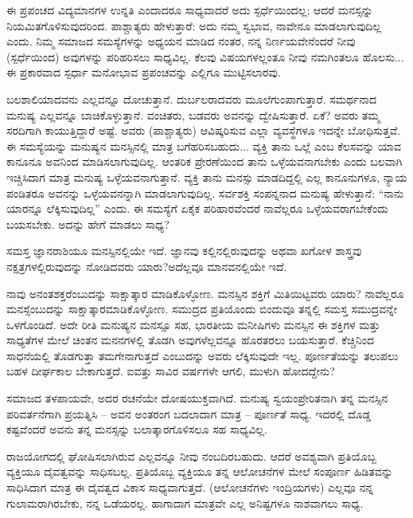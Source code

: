 \newpage

ಈ ಪ್ರಪಂಚದ ವಿದ್ಯಮಾನಗಳ ಉನ್ನತಿ ಎಂದಾದರೂ ಸಾಧ್ಯವಾದರೆ ಅದು ಸ್ಪರ್ಧೆಯಿಂದಲ್ಲ; ಆದರೆ ಮನಸ್ಸನ್ನು ನಿಯಮಿತಗೊಳಿಸುವುದರಿಂದ. ಪಾಶ್ಚಾತ್ಯರು ಹೇಳುತ್ತಾರೆ: ಅದು ನಮ್ಮ ಸ್ವಭಾವ, ನಾವೇನೂ ಮಾಡಲಾಗುವುದಿಲ್ಲ ಎಂದು. ನಿಮ್ಮ ಸಮಾಜದ ಸಮಸ್ಯೆಗಳನ್ನು ಅಧ್ಯಯನ ಮಾಡಿದ ನಂತರ, ನನ್ನ ನಿರ್ಣಯವೇನೆಂದರೆ ನೀವು (ಸ್ಪರ್ಧೆಯಿಂದ) ಅವುಗಳನ್ನು ಪರಿಹರಿಸಲು ಸಾಧ್ಯವಿಲ್ಲ. ಕೆಲವು ವಿಷಯಗಳಲ್ಲಂತೂ ನೀವು ನಮಗಿಂತಲೂ ಹೊಲಸು... ಈ ಪ್ರಕಾರವಾದ ಸ್ಪರ್ಧಾ ಮನೋಭಾವ ಪ್ರಪಂಚವನ್ನು ಎಲ್ಲಿಗೂ ಮುಟ್ಟಿಸಲಾರವು.

\vskip 1.5pt

ಬಲಶಾಲಿಯಾದವನು ಎಲ್ಲವನ್ನೂ ದೋಚುತ್ತಾನೆ. ದುರ್ಬಲರಾದವರು ಮೂಲೆಗುಂಪಾಗುತ್ತಾರೆ. ಸಮರ್ಥನಾದ ಮನುಷ್ಯ ಎಲ್ಲವನ್ನೂ ಬಾಚಿಕೊಳ್ಳುತ್ತಾನೆ. ವಂಚಿತರು, ಬಡವರು ಅವನನ್ನು ದ್ವೇಷಿಸುತ್ತಾರೆ. ಏಕೆ? ಅವರು ತಮ್ಮ ಸರದಿಗಾಗಿ ಕಾಯುತ್ತಿದ್ದಾರೆ ಅಷ್ಟೆ. ಅವರು (ಪಾಶ್ಚಾತ್ಯರು) ಆವಿಷ್ಕರಿಸುವ ಎಲ್ಲಾ ವ್ಯವಸ್ಥೆಗಳೂ ಇದನ್ನೇ ಬೋಧಿಸುತ್ತವೆ. ಈ ಸಮಸ್ಯೆಯನ್ನು ಮನುಷ್ಯನ ಮನಸ್ಸಿನಲ್ಲಿ ಮಾತ್ರ ಬಗೆಹರಿಸಬಹುದು... ವ್ಯಕ್ತಿ ತಾನು ಒಲ್ಲೆ ಎಂಬ ಕೆಲಸವನ್ನು ಯಾವ ಕಾನೂನೂ ಅವನಿಂದ ಮಾಡಿಸಲಾಗುವುದಿಲ್ಲ. ಆಂತರಿಕ ಪ್ರೇರಣೆಯಿಂದ ತಾನು ಒಳ್ಳೆಯವನಾಗಬೇಕು ಎಂದು ಬಲವಾಗಿ ಇಚ್ಚಿಸಿದಾಗ ಮಾತ್ರ ಮನುಷ್ಯ ಒಳ್ಳೆಯವನಾಗುತ್ತಾನೆ. ವ್ಯಕ್ತಿ ತಾನು ಮನಸ್ಸು ಮಾಡದಿದ್ದಲ್ಲಿ ಎಲ್ಲ ಕಾನೂನುಗಳೂ, ನ್ಯಾಯ ಪಂಡಿತರೂ ಅವನನ್ನು ಒಳ್ಳೆಯವನನ್ನಾಗಿ ಮಾಡಲಾಗುವುದಿಲ್ಲ. ಸರ್ವಶಕ್ತಿ ಸಂಪನ್ನನಾದ ಮನುಷ್ಯ ಹೇಳುತ್ತಾನೆ: “ನಾನು ಯಾರನ್ನೂ ಲೆಕ್ಕಿಸುವುದಿಲ್ಲ” ಎಂದು. ಈ ಸಮಸ್ಯೆಗೆ ಏಕೈಕ ಪರಿಹಾರವೆಂದರೆ ನಾವೆಲ್ಲರೂ ಒಳ್ಳೆಯವರಾಗಬೇಕೆಂದು ಬಯಸಬೇಕು. ಅದನ್ನು ಹೇಗೆ ಮಾಡಲು ಸಾಧ್ಯ?

\vskip 1.5pt

ಸಮಸ್ತ ಜ್ಞಾನರಾಶಿಯೂ ಮನಸ್ಸಿನಲ್ಲಿಯೇ ಇದೆ. ಜ್ಞಾನವು ಕಲ್ಲಿನಲ್ಲಿರುವುದನ್ನು ಅಥವಾ ಖಗೋಳ ಶಾಸ್ತ್ರವು ನಕ್ಷತ್ರಗಳಲ್ಲಿರುವುದನ್ನು ನೋಡಿದವರು ಯಾರು?\break ಅದೆಲ್ಲವೂ ಮಾನವನಲ್ಲಿಯೇ ಇದೆ.

\vskip 1.5pt

ನಾವು ಅನಂತಶಕ್ತರೆಂಬುದನ್ನು ಸಾಕ್ಷಾತ್ಕಾರ ಮಾಡಿಕೊಳ್ಳೋಣ. ಮನಸ್ಸಿನ ಶಕ್ತಿಗೆ ಮಿತಿಯಿಟ್ಟವರು ಯಾರು? ನಾವೆಲ್ಲರೂ ಮನಸ್ಸೆಂಬುದನ್ನು ಸಾಕ್ಷಾತ್ಕಾರ\break ಮಾಡಿಕೊಳ್ಳೋಣ. ಸಮುದ್ರದ ಪ್ರತಿಯೊಂದು ಬಿಂದುವೂ ತನ್ನಲ್ಲಿ ಸಮಸ್ತ ಸಮುದ್ರವನ್ನೇ ಒಳಗೊಂಡಿದೆ. ಅದೇ ರೀತಿ ಮನುಷ್ಯನ ಮನಸ್ಸೂ ಸಹ, ಭಾರತೀಯ ಮನೀಷಿಗಳು ಮನಸ್ಸಿನ ಈ ಶಕ್ತಿಗಳ ಮತ್ತು ಸಾಧ್ಯತೆಗಳ ಮೇಲೆ ಚಿಂತನ ಮನನಗಳಲ್ಲಿ ತೊಡಗಿ ಅವುಗಳೆಲ್ಲವನ್ನೂ ಹೊರತರಲು ಬಯಸುತ್ತಾರೆ. ಕೆಚ್ಚಿನಿಂದ ಸಾಧನೆಯಲ್ಲಿ ತೊಡಗುತ್ತಾ ತಮಗೇನಾಗುತ್ತದೆ ಎಂಬುದನ್ನು ಅವರು ಲೆಕ್ಕಿಸುವುದೇ ಇಲ್ಲ. ಪೂರ್ಣತೆಯನ್ನು ತಲುಪಲು ಬಹಳ ದೀರ್ಘಕಾಲ ಬೇಕಾಗುತ್ತದೆ. ಐವತ್ತು ಸಾವಿರ ವರ್ಷಗಳೇ ಆಗಲಿ, ಮುಳುಗಿ ಹೋದದ್ದೇನು?

\newpage

ಸಮಾಜದ ತಳಪಾಯವೇ, ಅದರ ರಚನೆಯೇ ದೋಷಯುಕ್ತವಾಗಿದೆ. ಮನುಷ್ಯ ಸ್ವಯಂಪ್ರೇರಿತನಾಗಿ ತನ್ನ ಮನಸ್ಸಿನ ಪರಿವರ್ತನೆಗಾಗಿ ಪ್ರಯತ್ನಿಸಿ – ಅವನ ಅಂತರಂಗ ಬದಲಾದಾಗ ಮಾತ್ರ – ಪೂರ್ಣತೆ ಸಾಧ್ಯ. ಇದರಲ್ಲಿ ದೊಡ್ಡ ಕಷ್ಟವೆಂದರೆ ಅವನು ತನ್ನ ಮನಸ್ಸನ್ನು ಬಲಾತ್ಕಾರಗೊಳಿಸಲೂ ಸಹ ಸಾಧ್ಯವಿಲ್ಲ.

\vskip 1.5pt

ರಾಜಯೋಗದಲ್ಲಿ ಘೋಷಿಸಲಾಗಿರುವ ಎಲ್ಲವನ್ನೂ ನೀವು ನಂಬದಿರಬಹುದು. ಆದರೆ ಅವಶ್ಯವಾಗಿ ಪ್ರತಿಯೊಬ್ಬ ವ್ಯಕ್ತಿಯೂ ದೈವತ್ವವನ್ನು ಸಾಧಿಸಬಲ್ಲ. ಪ್ರತಿಯೊಬ್ಬ ವ್ಯಕ್ತಿಯೂ ತನ್ನ ಆಲೋಚನೆಗಳ ಮೇಲೆ ಸಂಪೂರ್ಣ ಹಿಡಿತವನ್ನು ಸಾಧಿಸಿದಾಗ ಮಾತ್ರ ಈ ದೈವತ್ವದ ವಿಕಾಸ ಸಾಧ್ಯವಾಗುತ್ತದೆ. (ಆಲೋಚನೆಗಳು ಇಂದ್ರಿಯಗಳು) ಎಲ್ಲವೂ ನನ್ನ ಗುಲಾಮರಾಗಿರಬೇಕು, ನನ್ನ ಒಡೆಯರಲ್ಲ. ಹಾಗಾದಾಗ ಮಾತ್ರವೇ ಎಲ್ಲ ಅನಿಷ್ಟಗಳೂ ನಾಶವಾಗಲು ಸಾಧ್ಯ.

